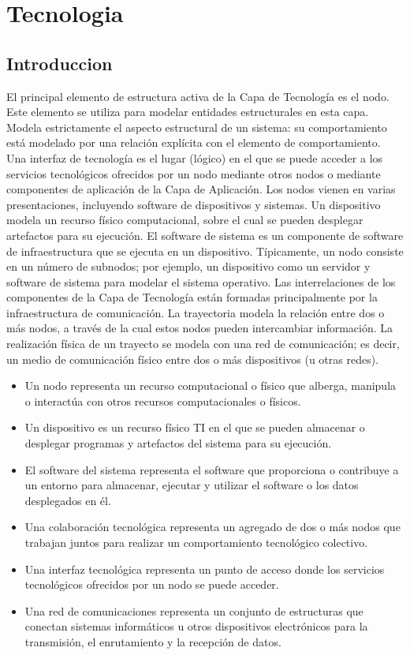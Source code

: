 \chapter{Tecnologia}
\section{Introduccion}
El principal elemento de estructura activa de la Capa de Tecnología es el nodo. Este elemento se utiliza para modelar entidades estructurales en esta capa. Modela estrictamente el aspecto estructural de un sistema: su comportamiento está modelado por una relación explícita con el elemento de comportamiento. Una interfaz de tecnología es el lugar (lógico) en el que se puede acceder a los servicios tecnológicos ofrecidos por un nodo mediante otros nodos o mediante componentes de aplicación de la Capa de Aplicación. Los nodos vienen en varias presentaciones, incluyendo software de dispositivos y sistemas. Un dispositivo modela un recurso físico computacional, sobre el cual se pueden desplegar artefactos para su ejecución. El software de sistema es un componente de software de infraestructura que se ejecuta en un dispositivo. Típicamente, un nodo consiste en un número de subnodos; por ejemplo, un dispositivo como un servidor y software de sistema para modelar el sistema operativo.
Las interrelaciones de los componentes de la Capa de Tecnología están formadas principalmente por la infraestructura de comunicación. La trayectoria modela la relación entre dos o más nodos, a través de la cual estos nodos pueden intercambiar información. La realización física de un trayecto se modela con una red de comunicación; es decir, un medio de comunicación físico entre dos o más dispositivos (u otras redes).

\begin{itemize}
	\item Un nodo representa un recurso computacional o físico que alberga, manipula o interactúa con otros recursos computacionales o físicos.
	\item Un dispositivo es un recurso físico TI en el que se pueden almacenar o desplegar programas y artefactos del sistema para su ejecución.
	\item El software del sistema representa el software que proporciona o contribuye a un entorno para almacenar, ejecutar y utilizar el software o los datos desplegados en él.
	\item Una colaboración tecnológica representa un agregado de dos o más nodos que trabajan juntos para realizar un comportamiento tecnológico colectivo.
	\item Una interfaz tecnológica representa un punto de acceso donde los servicios tecnológicos ofrecidos por un nodo
	se puede acceder.
	\item Una red de comunicaciones representa un conjunto de estructuras que conectan sistemas informáticos u otros dispositivos electrónicos para la transmisión, el enrutamiento y la recepción de datos.
\end{itemize}

